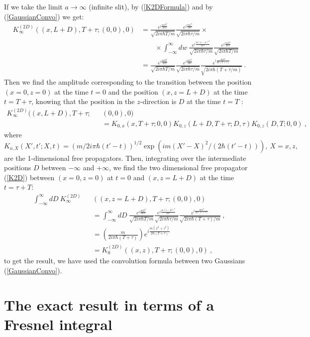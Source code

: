 \documentclass[12pt,aps,prb,preprint]{revtex4-1}   %
\begin{document}
If we take the limit $a\rightarrow\infty$ (infinite slit), 
by (\ref{K2DFormula}) and by (\ref{GaussianConvo}) we get:
\begin{align*}
K_{\infty}^{(2D)}((x,L+D),T+\tau;(0,0),0)&=\frac{e^{i\frac{mD^2}{2\hbar T}}}{\sqrt{2i\pi\hbar T/m}} 
\frac{e^{i\frac{m L^2}{2\hbar\tau}}}{\sqrt{2i\pi\hbar\tau/m}}\times \\
& \qquad \times \int_{-\infty}^{\infty}dw\ \frac{e^{i\frac{m (x-w)^2}{2\hbar\tau}}}{\sqrt{2i\pi\hbar\tau/m}}
\frac{e^{i\frac{m w^2}{2\hbar T}}}{\sqrt{2i\pi\hbar T/m}}
{}\\{}&=\frac{e^{i\frac{mD^2}{2\hbar T}}}{\sqrt{2i\pi\hbar T/m}} 
\frac{e^{i\frac{m L^2}{2\hbar\tau}}}{\sqrt{2i\pi\hbar\tau/m}}
\frac{e^{i\frac{m x^2}{2\hbar (T+\tau)}}}{\sqrt{2i\pi\hbar (T+\tau/m)}}\ .
\end{align*}
Then we find the amplitude corresponding to the transition
between the position $(x=0,z=0)$ at the time $t=0$ 
and the position $(x,z=L+D)$ at the time $t=T+\tau$, 
knowing that the position in the $z$-direction is $D$ at the time $t=T$ :
\begin{eqnarray*}
K_{\infty}^{(2D)}((x,L+D),T+\tau;&&(0,0),0)
{}\\{}&&=K_{0,x}\left(x,T+\tau;0,0\right)K_{0,z}\left(L+D,T+\tau;D,\tau\right)K_{0,z}\left(D,T;0,0\right)\ ,
\end{eqnarray*}
where $K_{o,X}(X',t';X,t)=(m/2i\pi\hbar(t'-t))^{1/2}\exp{\left(im(X'-X)^2/(2\hbar(t'-t))\right)},\ X=x,z,$ 
are the 1-dimensional free propagators.
Then, integrating over the intermediate positions $D$ between $-\infty$ and $+\infty$,
we find the two dimensional free propagator (\ref{K2D}) between $(x=0,z=0)$ at $t=0$
and $(x,z=L+D)$ at the time $t=\tau+T$:
\begin{eqnarray*}
\int_{-\infty}^{\infty}dD\ K_{\infty}^{(2D)}&&((x,z=L+D),T+\tau;(0,0),0)
{}\\{}&&=\int_{-\infty}^{\infty}dD\ \frac{e^{i\frac{mD^2}{2\hbar T}}}{\sqrt{2i\pi\hbar T/m}} 
\frac{e^{i\frac{m (z-D)^2}{2\hbar\tau}}}{\sqrt{2i\pi\hbar\tau/m}}
\frac{e^{i\frac{m x^2}{2\hbar (T+\tau)}}}{\sqrt{2i\pi\hbar (T+\tau)/m}}\ ,
{}\\{}&&=\left(\frac{m}{2i\pi\hbar (T+\tau)}\right)e^{i\frac{m (x^2+z^2)}{2\hbar (T+\tau)}}
{}\\{}&&= K_0^{(2D)}((x,z),T+\tau;(0,0),0)\ ,
\end{eqnarray*} 
to get the result, we have used the convolution formula between two Gaussians (\ref{GaussianConvo}).

\section{The exact result in terms of a Fresnel integral}
\end{document}
